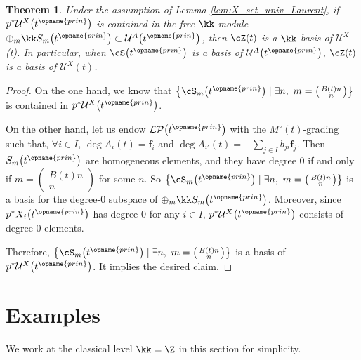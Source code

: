 \documentclass[pdftex]{sigma}
\newcommand{\Mc}{M^\circ}
\newcommand{\upClAlg}{\mathcal{U}^A}
\newcommand{\XClAlg}{\mathcal{U}^X}
\newcommand{\LP}{{\mathcal{LP}}}
\newcommand{\prin}{{\opname{prin}}}
\newcommand{\ff}{\mathbf{f}}
\numberwithin{equation}{section}
\newtheorem{Theorem}{Theorem}[section]
\begin{document}
\begin{Theorem}\label{thm:construct_X_bases}
Under the assumption of Lemma {\rm \ref{lem:X_set_univ_Laurent}}, if $p^{*}\XClAlg\big(t^{\prin}\big)$ is contained in the free $\kk$-module
$\oplus_{m}\kk S_{m}\big(t^{\prin}\big)\subset\upClAlg\big(t^{\prin}\big)$, then
$\cZ(t)$ is a $\kk$-basis of $\XClAlg$(t). In particular, when
$\cS\big(t^{\prin}\big)$ is a basis of $\upClAlg\big(t^{\prin}\big)$, $\cZ(t)$
is a basis of $\XClAlg(t)$.
\end{Theorem}
\begin{proof}
On the one hand, we know that $\bigl\{\cS_{m}\big(t^{\prin}\big)\mid \exists n,\ m=\left(\begin{smallmatrix}
B(t)n\\
n
\end{smallmatrix}\right)\bigr\}$
 is contained in $p^{*}\XClAlg\big(t^{\prin}\big)$.

On the other hand, let us endow $\LP\big(t^{\prin}\big)$ with the $\Mc(t)$-grading
such that, $\forall i\in I$, $\deg A_{i}(t)=\ff_{i}$ and $\deg A_{i'}(t)=-\sum_{j\in I}b_{ji}\ff_{j}$.
Then $S_{m}\big(t^{\prin}\big)$ are homogeneous elements, and they have degree
$0$ if and only if $m=\left(\begin{smallmatrix}
B(t)n\\
n
\end{smallmatrix}\right)$ for some $n$. So $\bigl\{\cS_{m}\big(t^{\prin}\big)\mid \exists n,\ m=\left(\begin{smallmatrix}
B(t)n\\
n
\end{smallmatrix}\right)\bigr\}$ is a basis for the degree-$0$ subspace of $\oplus_{m}\kk S_{m}\big(t^{\prin}\big)$.
Moreover, since $p^{*}X_{i}\big(t^{\prin}\big)$ has degree $0$ for any $i\in I$,
$p^{*}\XClAlg\big(t^{\prin}\big)$ consists of degree $0$ elements.

Therefore, $\bigl\{\cS_{m}\big(t^{\prin}\big)\mid \exists n,\ m=\left(\begin{smallmatrix}
B(t)n\\
n
\end{smallmatrix}\right)\bigr\}$ is a basis of $p^{*}\XClAlg\big(t^{\prin}\big)$. It implies the desired
claim.
\end{proof}

\section{Examples}\label{sec:Examples}
We work at the classical level $\kk=\Z$ in this section for simplicity.
\end{document}

